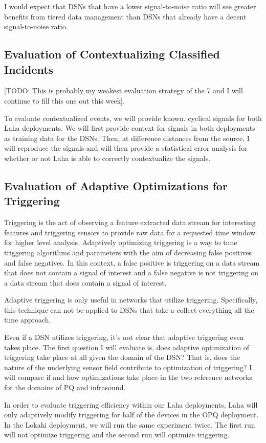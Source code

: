 I would expect that DSNs that have a lower signal-to-noise ratio will see greater benefits from tiered data management than DSNs that already have a decent signal-to-noise ratio.

\subsection{Evaluation of Contextualizing Classified Incidents}
[TODO: This is probably my weakest evaluation strategy of the 7 and I will continue to fill this one out this week].

To evaluate contextualized events, we will provide known. cyclical signals for both Laha deployments. We will first provide context for signals in both deployments as training data for the DSNs. Then, at difference distances from the source, I will reproduce the signals and will then provide a statistical error analysis for whether or not Laha is able to correctly contextualize the signals.

\subsection{Evaluation of Adaptive Optimizations for Triggering}
Triggering is the act of observing a feature extracted data stream for interesting features and triggering sensors to provide raw data for a requested time window for higher level analysis. Adaptively optimizing triggering is a way to tune triggering algorithms and parameters with the aim of decreasing false positives and false negatives. In this context, a false positive is triggering on a data stream that does not contain a signal of interest and a false negative is not triggering on a data stream that does contain a signal of interest. 

Adaptive triggering is only useful in networks that utilize triggering. Specifically, this technique can not be applied to DSNs that take a collect everything all the time approach.

Even if a DSN utilizes triggering, it's not clear that adaptive triggering even takes place. The first question I will evaluate is, does adaptive optimization of triggering take place at all given the domain of the DSN? That is, does the nature of the underlying sensor field contribute to optimization of triggering? I will compare if and how optimizations take place in the two reference networks for the domains of PQ and infrasound.

In order to evaluate triggering efficiency within our Laha deployments, Laha will only adaptively modify triggering for half of the devices in the OPQ deployment. In the Lokahi deployment, we will run the same experiment twice. The first run will not optimize triggering and the second run will optimize triggering.

